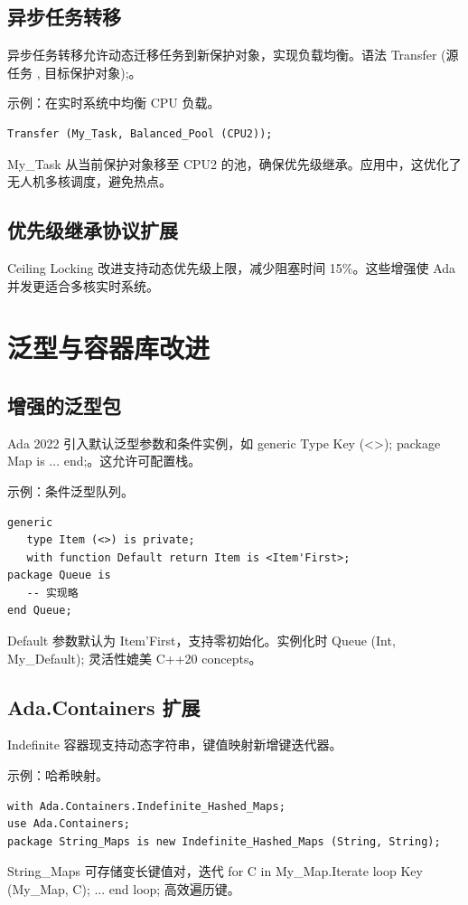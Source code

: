 \section{异步任务转移}
异步任务转移允许动态迁移任务到新保护对象，实现负载均衡。语法 Transfer (源任务 , 目标保护对象);。\par
示例：在实时系统中均衡 CPU 负载。\par
\begin{lstlisting}
Transfer (My_Task, Balanced_Pool (CPU2));
\end{lstlisting}
My\_{}Task 从当前保护对象移至 CPU2 的池，确保优先级继承。应用中，这优化了无人机多核调度，避免热点。\par
\section{优先级继承协议扩展}
Ceiling Locking 改进支持动态优先级上限，减少阻塞时间 15\%{}。这些增强使 Ada 并发更适合多核实时系统。\par
\chapter{泛型与容器库改进}
\section{增强的泛型包}
Ada 2022 引入默认泛型参数和条件实例，如 generic Type Key (<>); package Map is ... end;。这允许可配置栈。\par
示例：条件泛型队列。\par
\begin{lstlisting}
generic
   type Item (<>) is private;
   with function Default return Item is <Item'First>;
package Queue is
   -- 实现略
end Queue;
\end{lstlisting}
Default 参数默认为 Item'First，支持零初始化。实例化时 Queue (Int, My\_{}Default); 灵活性媲美 C++20 concepts。\par
\section{Ada.Containers 扩展}
Indefinite 容器现支持动态字符串，键值映射新增键迭代器。\par
示例：哈希映射。\par
\begin{lstlisting}
with Ada.Containers.Indefinite_Hashed_Maps;
use Ada.Containers;
package String_Maps is new Indefinite_Hashed_Maps (String, String);
\end{lstlisting}
String\_{}Maps 可存储变长键值对，迭代 for C in My\_{}Map.Iterate loop Key (My\_{}Map, C); ... end loop; 高效遍历键。\par
